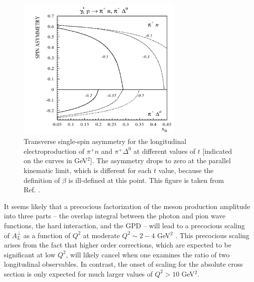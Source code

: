\begin{figure}[hbt!]
\begin{center}
\includegraphics[height=7cm]{./figures/frankfurt_atpi.pdf}
\end{center}
\caption{\label{fig:frankfurt_atpi}
Transverse single-spin asymmetry for the longitudinal electroproduction of
$\pi^+n$ and $\pi^+\Delta^0$ at different values of $t$ [indicated on the
curves in GeV$^2$].  The asymmetry drops to zero at the parallel kinematic
limit, which is different for each $t$ value, because the definition of
$\beta$ is ill-defined at this point.  This figure is taken from
Ref. .
}
\end{figure}

It seems likely that a precocious factorization of the meson production
amplitude into three parts -- the overlap integral between the photon and pion
wave functions, the hard interaction, and the GPD -- will lead to a precocious
scaling of $A_L^{\perp}$ as a function of $Q^2$ at moderate $Q^2\sim 2-4$
GeV$^2$ \cite{Fr99}.  This precocious scaling arises from the fact that higher
order corrections, which are expected to be significant at low $Q^2$, will
likely cancel when one examines the ratio of two longitudinal observables.  In
contrast, the onset of scaling for the absolute cross section is only expected
for much larger values of $Q^2>10$ GeV$^2$.

